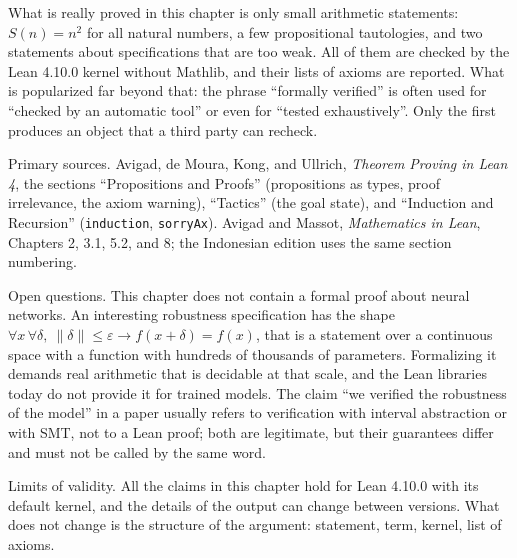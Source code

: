 \begin{untukpeneliti}
What is really proved in this chapter is only small arithmetic statements: $S(n)=n^{2}$ for all
natural numbers, a few propositional tautologies, and two statements about specifications that are
too weak. All of them are checked by the Lean 4.10.0 kernel without Mathlib, and their lists of
axioms are reported. What is popularized far beyond that: the phrase ``formally verified'' is often
used for ``checked by an automatic tool'' or even for ``tested exhaustively''. Only the first
produces an object that a third party can recheck.

Primary sources. Avigad, de Moura, Kong, and Ullrich, \emph{Theorem Proving in Lean 4}, the sections
``Propositions and Proofs'' (propositions as types, proof irrelevance, the axiom warning),
``Tactics'' (the goal state), and ``Induction and Recursion'' (\texttt{induction},
\texttt{sorryAx}). Avigad and Massot, \emph{Mathematics in Lean}, Chapters 2, 3.1, 5.2, and 8; the
Indonesian edition uses the same section numbering.

Open questions. This chapter does not contain a formal proof about neural networks. An interesting
robustness specification has the shape
$\forall x\,\forall\delta,\ \lVert\delta\rVert\le\varepsilon\to f(x+\delta)=f(x)$, that is a
statement over a continuous space with a function with hundreds of thousands of parameters.
Formalizing it demands real arithmetic that is decidable at that scale, and the Lean libraries today
do not provide it for trained models. The claim ``we verified the robustness of the model'' in a
paper usually refers to verification with interval abstraction or with SMT, not to a Lean proof; both
are legitimate, but their guarantees differ and must not be called by the same word.

Limits of validity. All the claims in this chapter hold for Lean 4.10.0 with its default kernel, and
the details of the output can change between versions. What does not change is the structure of the
argument: statement, term, kernel, list of axioms.
\end{untukpeneliti}

